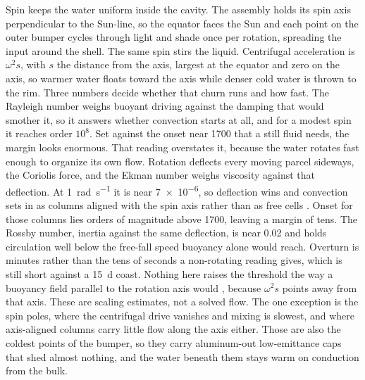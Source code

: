 \documentclass{article}
\begin{document}
Spin keeps the water uniform inside the cavity. The assembly holds its spin axis perpendicular to the Sun-line, so the equator faces the Sun and each point on the outer bumper cycles through light and shade once per rotation, spreading the input around the shell. The same spin stirs the liquid. Centrifugal acceleration is \(\omega^2 s\), with \(s\) the distance from the axis, largest at the equator and zero on the axis, so warmer water floats toward the axis while denser cold water is thrown to the rim. Three numbers decide whether that churn runs and how fast. The Rayleigh number weighs buoyant driving against the damping that would smother it, so it answers whether convection starts at all, and for a modest spin it reaches order \(10^8\). Set against the onset near \num{1700} that a still fluid needs, the margin looks enormous. That reading overstates it, because the water rotates fast enough to organize its own flow. Rotation deflects every moving parcel sideways, the Coriolis force, and the Ekman number weighs viscosity against that deflection. At \SI{1}{\radian\per\second} it is near \num{7e-6}, so deflection wins and convection sets in as columns aligned with the spin axis rather than as free cells \cite{greenspan1968rotating}. Onset for those columns lies orders of magnitude above \num{1700}, leaving a margin of tens. The Rossby number, inertia against the same deflection, is near \num{0.02} and holds circulation well below the free-fall speed buoyancy alone would reach. Overturn is minutes rather than the tens of seconds a non-rotating reading gives, which is still short against a \SI{15}{\day} coast. Nothing here raises the threshold the way a buoyancy field parallel to the rotation axis would \cite{chandrasekhar1961hydrodynamic}, because \(\omega^2 s\) points away from that axis. These are scaling estimates, not a solved flow. The one exception is the spin poles, where the centrifugal drive vanishes and mixing is slowest, and where axis-aligned columns carry little flow along the axis either. Those are also the coldest points of the bumper, so they carry aluminum-out low-emittance caps that shed almost nothing, and the water beneath them stays warm on conduction from the bulk.
\end{document}
